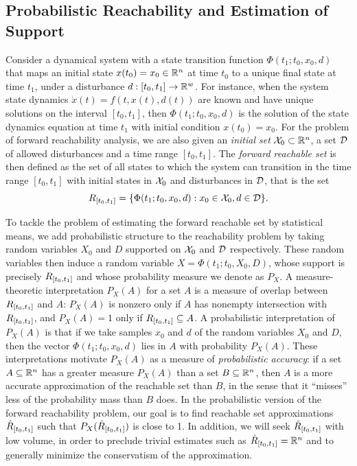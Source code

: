 \documentclass[onefignum,onetabnum]{siamart171218}
\begin{document}
%
%
%
%
%
%
%
%
%
%

\subsection{Probabilistic Reachability and Estimation of Support}%
\label{sub:probabilistic_reachability_and_estimation_of_support}

Consider a
dynamical system with a state transition function
$\Phi(t_1;t_0, x_0, d)$
that maps an initial state $x(t_0)=x_0\in\mathbb{R}^n$ at time $t_0$ to a unique final state
at time $t_1$, under
a disturbance $d:[t_0,t_1]\to\mathbb{R}^{w}$.
For instance, when the system state dynamics $ \dot{x}(t) = f(t,x(t),d(t))$
are known and have unique solutions on the interval $[t_0,t_1]$, then
$\Phi(t_1;t_0, x_0, d)$ is the solution of the state dynamics equation at time
$t_1$ with initial condition $x(t_0)=x_0$.
For the problem of forward reachability analysis, we are also given an
\emph{initial set} $\mathcal{X}_0\subset\mathbb{R}^n$, a set $\mathcal{D}$ of allowed
disturbances and a time range $[t_0,t_1]$. The \emph{forward reachable set} is
then defined as the set of all states to which the system can transition in the
time range $[t_0,t_1]$ with initial states in $\mathcal{X}_0$ and disturbances in
$\mathcal{D}$, that is the set
\begin{equation}
     R_{[t_0,t_1]} = \{\Phi(t_1;t_0,x_0, d) : x_0\in\mathcal{X}_0, d\in\mathcal{D}\}.
\end{equation}

To tackle the problem of estimating the forward reachable set by statistical means, we
add probabilistic structure to the reachability problem 
by taking random variables $X_0$ and $D$ supported on $\mathcal{X}_0$ and $\mathcal{D}$ respectively. 
These random variables then induce a random variable
$X=\Phi(t_1;t_0, X_0, D)$, 
whose support is precisely $R_{[t_0,t_1]}$ and
whose probability measure we denote as $P_X$.
A measure-theoretic interpretation $P_X(A)$ for a set $A$ is a measure of overlap between
$R_{[t_0,t_1]}$ and $A$: $P_X(A)$ is nonzero
only if $A$ has nonempty intersection with $R_{[t_0,t_1]}$, and $P_X(A)=1$ only if
$R_{[t_0,t_1]}\subseteq A$.
A probabilistic interpretation of $P_X(A)$ is that if we take samples $x_0$ and $d$ of the random
variables $X_0$ and $D$, then the vector $\Phi(t_1;t_0,x_0,d)$ lies in
$A$ with probability $P_X(A)$.
These interpretations motivate $P_X(A)$ as a
measure of \emph{probabilistic accuracy}: if a set $A\subseteq\mathbb{R}^n$ has a
greater measure $P_X(A)$ than a set $B\subseteq\mathbb{R}^n$, then $A$ is a more
accurate approximation of the reachable set than $B$, in the sense that it
``misses'' less of the probability mass than $B$ does.
In the probabilistic
version of the forward reachability problem, our goal is to find
reachable set approximations $\hat{R}_{[t_0,t_1]}$ such that $P_X(\hat{R}_{[t_0,t_1]})$ is close to 1.
In addition, we will seek $\hat{R}_{[t_0,t_1]}$ with low volume, in order to preclude trivial
estimates such as $\hat{R}_{[t_0,t_1]}=\mathbb{R}^n$ and to generally minimize the conservatism of the
approximation.
\end{document}
